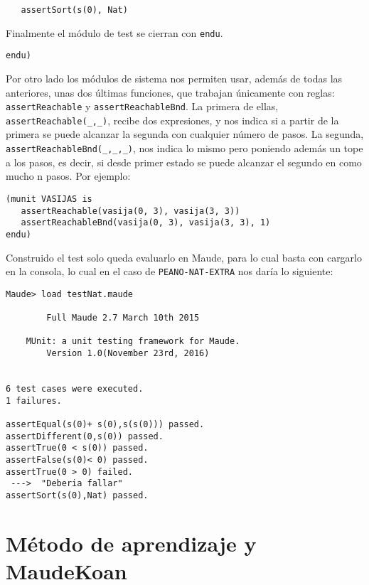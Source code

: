 {\codesize
\begin{verbatim}
   assertSort(s(0), Nat)
\end{verbatim}
} 

Finalmente el módulo de test se cierran con \texttt{endu}. \par

{\codesize
\begin{verbatim}
endu)
\end{verbatim}
}

Por otro lado los módulos de sistema nos permiten usar, además de todas las anteriores, unas dos últimas funciones, que trabajan únicamente con reglas: \verb"assertReachable" y \verb"assertReachableBnd". La primera de ellas,\\ \verb"assertReachable(_,_)", recibe dos expresiones, y nos indica si a partir de la primera se puede alcanzar la segunda con cualquier número de pasos. La segunda, \verb"assertReachableBnd(_,_,_)", nos indica lo mismo pero poniendo además un tope a los pasos, es decir, si desde primer estado se puede alcanzar el segundo en como mucho n pasos. Por ejemplo: \par

{\codesize
\begin{verbatim}
(munit VASIJAS is
   assertReachable(vasija(0, 3), vasija(3, 3))
   assertReachableBnd(vasija(0, 3), vasija(3, 3), 1)
endu)
\end{verbatim}
}

Construido el test solo queda evaluarlo en Maude, para lo cual basta con cargarlo en la consola, lo cual en el caso de \texttt{PEANO-NAT-EXTRA} nos daría lo siguiente:\par

{\codesize
\begin{verbatim}
Maude> load testNat.maude

	    Full Maude 2.7 March 10th 2015

	MUnit: a unit testing framework for Maude.
		Version 1.0(November 23rd, 2016)


6 test cases were executed.
1 failures.

assertEqual(s(0)+ s(0),s(s(0))) passed.
assertDifferent(0,s(0)) passed.
assertTrue(0 < s(0)) passed.
assertFalse(s(0)< 0) passed.
assertTrue(0 > 0) failed.
 --->  "Deberia fallar"
assertSort(s(0),Nat) passed.
\end{verbatim}
}

\section{Método de aprendizaje y MaudeKoan}

